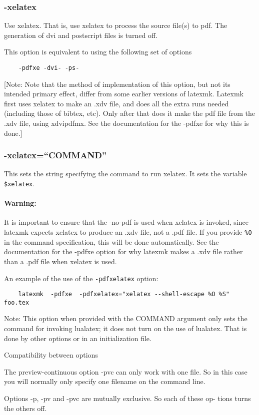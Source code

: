\subsubsection{-xelatex}

Use xelatex.  That is, use xelatex to process the source file(s) to pdf.  The
generation of dvi and postscript  files  is  turned off.

This option is equivalent to using the following set of options

\begin{verbatim}
	-pdfxe -dvi- -ps-
\end{verbatim}

[Note:  Note  that  the method of implementation of this option,
but not its intended primary effect, differ  from  some  earlier
versions  of latexmk. Latexmk first uses xelatex to make an .xdv
file, and does all the extra runs  needed  (including  those  of
bibtex,  etc).   Only  after that does it make the pdf file from
the .xdv file, using xdvipdfmx.  See the documentation  for  the
-pdfxe for why this is done.]


\subsubsection{-xelatex=``COMMAND''}

This  sets the string specifying the command to run xelatex.  It sets the
variable \verb|$xelatex|.  

\paragraph{Warning:}

It is important to ensure that the -no-pdf is used
when xelatex  is invoked, since latexmk expects xelatex to produce an .xdv
file, not a .pdf file. If you provide  \verb|%O|  in  the  command specification,
this  will be done automatically.  See the documentation for the -pdfxe
option for why  latexmk  makes  a  .xdv file rather than a .pdf file when
xelatex is used.

An example of the use of the \verb|-pdfxelatex| option:

\begin{verbatim}
	latexmk  -pdfxe  -pdfxelatex="xelatex --shell-escape %O %S" foo.tex
\end{verbatim}

Note: This option when provided with the COMMAND  argument  only sets  the
command for invoking lualatex; it does not turn on the use of lualatex. That is
done by other options or in an initialization file.

Compatibility between options

The  preview-continuous option -pvc can only work with one file.  So in
this case you will normally only specify one filename  on  the  command
line.

Options  -p, -pv and -pvc are mutually exclusive.  So each of these op- tions
turns the others off.



